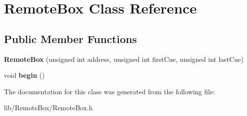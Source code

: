 \hypertarget{class_remote_box}{}\section{Remote\+Box Class Reference}
\label{class_remote_box}
\subsection*{Public Member Functions}
\begin{DoxyCompactItemize}
\item 
\mbox{\label{class_remote_box_a270efb8cca04e2071c71a78079f029ae}} 
{\bfseries Remote\+Box} (unsigned int address, unsigned int first\+Cue, unsigned int last\+Cue)
\item 
\mbox{\label{class_remote_box_a236dc1d9094bd80c57f8e83d66d2b038}} 
void {\bfseries begin} ()
\end{DoxyCompactItemize}


The documentation for this class was generated from the following file\+:\begin{DoxyCompactItemize}
\item 
lib/\+Remote\+Box/Remote\+Box.\+h\end{DoxyCompactItemize}

